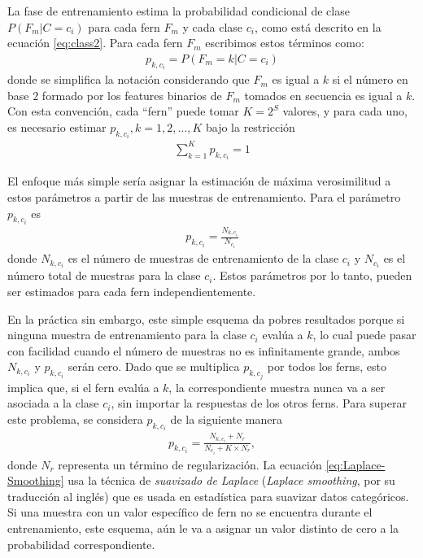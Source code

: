 		La fase de entrenamiento estima la probabilidad condicional de clase $P(F_m|C=c_i)$ para cada fern $F_m$	 y cada clase $c_i$, como está descrito en la ecuación \ref{eq:class2}. Para cada fern $F_m$ escribimos estos términos como:
		\begin{align}
			p_{k,c_i} = P(F_m = k | C = c_i)
		\end{align}
		donde se simplifica la notación considerando que $F_m$ es igual a $k$ si el número en base $2$ formado por los features binarios de $F_m$ tomados en secuencia es igual a $k$. Con esta convención, cada ``fern'' puede tomar $K=2^S$ valores, y para cada uno, es necesario estimar $p_{k,c_i}, k=1,2,\dots,K$ bajo la restricción
		\begin{align*}
			\sum_{k=1}^Kp_{k,c_i} = 1
		\end{align*}		
		
		El enfoque más simple sería asignar la estimación de máxima verosimilitud a estos parámetros a partir de las muestras de entrenamiento. Para el parámetro $p_{k,c_i}$ es
		\begin{align*}
			p_{k,c_i} = \frac{N_{k,c_i}}{N_{c_i}}
		\end{align*}
		donde $N_{k,c_i}$ es el número de muestras de entrenamiento de la clase $c_i$ y $N_{c_i}$ es el número total de muestras para la clase $c_i$. Estos parámetros por lo tanto, pueden ser estimados para cada fern independientemente.
		
		En la práctica sin embargo, este simple esquema da pobres resultados porque si ninguna muestra de entrenamiento para la clase $c_i$ evalúa a $k$, lo cual puede pasar con facilidad cuando el número de muestras no es infinitamente grande, ambos $N_{k,c_i}$ y $p_{k,c_i}$ serán cero. Dado que se multiplica $p_{k,c_j}$ por todos los ferns, esto implica que, si el fern evalúa a $k$, la correspondiente muestra nunca va a ser asociada a la clase $c_i$, sin importar la respuestas de los otros ferns. Para superar este problema, se considera $p_{k,c_i}$ de la siguiente manera
		\begin{align}
			\label{eq:Laplace-Smoothing}
			p_{k,c_i} = \frac{N_{k,c_i} + N_r}{N_{c_i} + K \times N_r},
		\end{align}
		donde $N_r$ representa un término de regularización. La ecuación \ref{eq:Laplace-Smoothing} usa la técnica de \textit{suavizado de Laplace} (\textit{Laplace smoothing}, por su traducción al inglés) que es usada en estadística para suavizar datos categóricos. Si una muestra con un valor específico de fern no se encuentra durante el entrenamiento, este esquema, aún le va a asignar un valor distinto de cero a la probabilidad correspondiente.